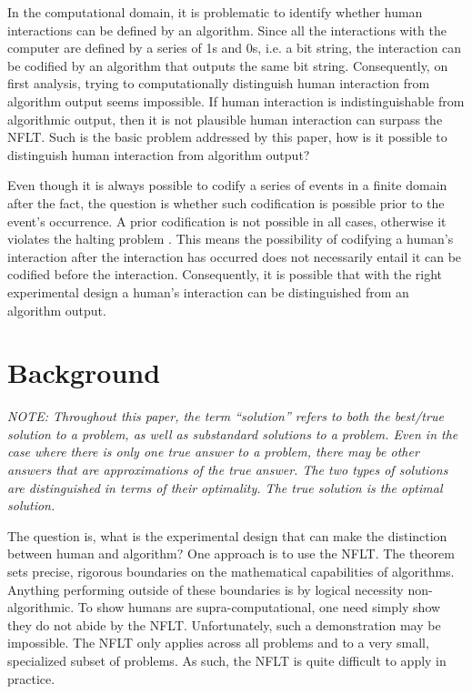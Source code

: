 In the computational domain, it is problematic to identify whether human interactions can be defined by an algorithm.  Since all the interactions with the computer are defined by a series of 1s and 0s, i.e. a bit string, the interaction can be codified by an algorithm that outputs the same bit string.  Consequently, on first analysis, trying to computationally distinguish human interaction from algorithm output seems impossible.  If human interaction is indistinguishable from algorithmic output, then it is not plausible human interaction can surpass the NFLT.  Such is the basic problem addressed by this paper, how is it possible to distinguish human interaction from algorithm output?

Even though it is always possible to codify a series of events in a finite domain after the fact, the question is whether such codification is possible prior to the event's occurrence.  A prior codification is not possible in all cases, otherwise it violates the halting problem \cite{cover06:_elemen_of_infor_theor}.  This means the possibility of codifying a human's interaction after the interaction has occurred does not necessarily entail it can be codified before the interaction.  Consequently, it is possible that with the right experimental design a human's interaction can be distinguished from an algorithm output.

\section{Background}\label{sec:background}

\emph{NOTE: Throughout this paper, the term ``solution'' refers to both the best/true solution to a problem, as well as substandard solutions to a problem.  Even in the case where there is only one true answer to a problem, there may be other answers that are approximations of the true answer.  The two types of solutions are distinguished in terms of their optimality.  The true solution is the optimal solution.}

The question is, what is the experimental design that can make the distinction between human and algorithm?  One approach is to use the NFLT.  The theorem sets precise, rigorous boundaries on the mathematical capabilities of algorithms. Anything performing outside of these boundaries is by logical necessity non-algorithmic.  To show humans are supra-computational, one need simply show they do not abide by the NFLT.  Unfortunately, such a demonstration may be impossible.  The NFLT only applies across all problems and to a very small, specialized subset of problems.  As such, the NFLT is quite difficult to apply in practice.

